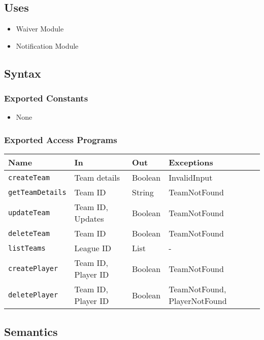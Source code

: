 \documentclass[12pt, titlepage]{article}
\begin{document}
\subsection{Uses}
\begin{itemize}
    \item Waiver Module
    \item Notification Module
\end{itemize}

\subsection{Syntax}

\subsubsection{Exported Constants}
\begin{itemize}
\item None
\end{itemize}

\subsubsection{Exported Access Programs}
\begin{center}
\begin{tabular}{|p{3cm}|p{4cm}|p{4cm}|p{4cm}|}
\hline
\textbf{Name} & \textbf{In} & \textbf{Out} & \textbf{Exceptions} \\
\hline
\texttt{createTeam} & Team details & Boolean & InvalidInput \\
\texttt{getTeamDetails} & Team ID & String & TeamNotFound \\
\texttt{updateTeam} & Team ID, Updates & Boolean & TeamNotFound \\
\texttt{deleteTeam} & Team ID & Boolean & TeamNotFound \\
\texttt{listTeams} & League ID & List & - \\
\texttt{createPlayer} & Team ID, Player ID & Boolean & TeamNotFound \\
\texttt{deletePlayer} & Team ID, Player ID & Boolean & TeamNotFound, PlayerNotFound \\
\hline
\end{tabular}
\end{center}

\subsection{Semantics}
\end{document}
